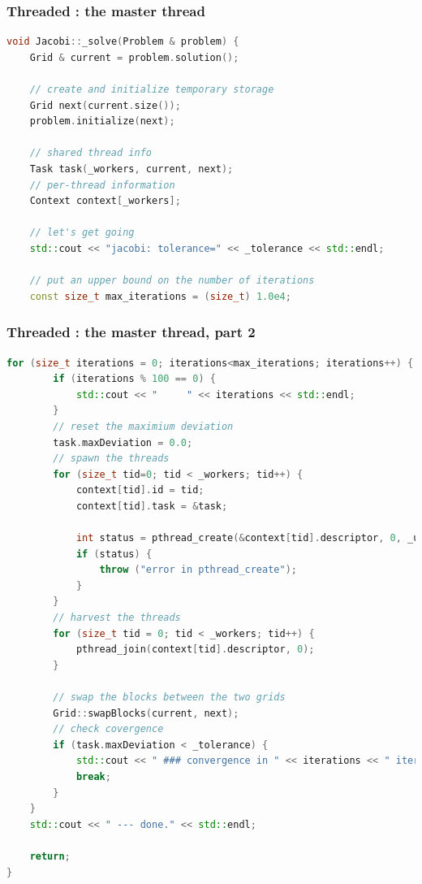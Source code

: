 \begin{frame}[fragile]
% 
  \frametitle{Threaded : the master thread}
%
  \begin{lstlisting}[language=c++,name=Jacobi:threaded]
void Jacobi::_solve(Problem & problem) {
    Grid & current = problem.solution();

    // create and initialize temporary storage
    Grid next(current.size());
    problem.initialize(next);

    // shared thread info
    Task task(_workers, current, next);
    // per-thread information
    Context context[_workers];

    // let's get going
    std::cout << "jacobi: tolerance=" << _tolerance << std::endl;

    // put an upper bound on the number of iterations
    const size_t max_iterations = (size_t) 1.0e4;
  \end{lstlisting}
%
\end{frame}

\begin{frame}[fragile]
% 
  \frametitle{Threaded : the master thread, part 2}
%
  \begin{lstlisting}[language=c++,name=Jacobi:threaded,basicstyle=\tt\bfseries\tiny]
    for (size_t iterations = 0; iterations<max_iterations; iterations++) {
        if (iterations % 100 == 0) {
            std::cout << "     " << iterations << std::endl;
        }
        // reset the maximium deviation
        task.maxDeviation = 0.0;
        // spawn the threads
        for (size_t tid=0; tid < _workers; tid++) {
            context[tid].id = tid;
            context[tid].task = &task;

            int status = pthread_create(&context[tid].descriptor, 0, _update, &context[tid]);
            if (status) {
                throw ("error in pthread_create");
            }
        }
        // harvest the threads
        for (size_t tid = 0; tid < _workers; tid++) {
            pthread_join(context[tid].descriptor, 0);
        }

        // swap the blocks between the two grids
        Grid::swapBlocks(current, next);
        // check covergence
        if (task.maxDeviation < _tolerance) {
            std::cout << " ### convergence in " << iterations << " iterations!" << std::endl;
            break;
        }
    }
    std::cout << " --- done." << std::endl;

    return;
}
  \end{lstlisting}
%
\end{frame}

